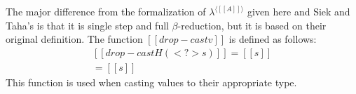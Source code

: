 
The major difference from the formalization of $\lambda^{\langle [[A]]
  \rangle}$ given here and Siek and Taha's is that it is single step
and full $\beta$-reduction, but it is based on their original
definition.  The function $[[drop-cast v]]$ is defined as follows:
\[
\begin{array}{lll}
  [[drop-cast H(<?>s)]] = [[s]]\\
  [[drop-cast s]] = [[s]]
\end{array}
\]
This function is used when casting values to their appropriate type.


